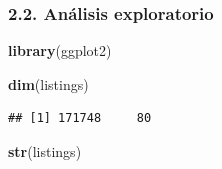 \documentclass[
]{article}
\newenvironment{Shaded}{\begin{snugshade}}{\end{snugshade}}
\newcommand{\FunctionTok}[1]{\textcolor[rgb]{0.13,0.29,0.53}{\textbf{#1}}}
\newcommand{\NormalTok}[1]{#1}
\begin{document}
\subsubsection{2.2. Análisis
exploratorio}\label{anuxe1lisis-exploratorio}

\begin{Shaded}
\begin{Highlighting}[]
\FunctionTok{library}\NormalTok{(ggplot2)}

\FunctionTok{dim}\NormalTok{(listings)}
\end{Highlighting}
\end{Shaded}

\begin{verbatim}
## [1] 171748     80
\end{verbatim}

\begin{Shaded}
\begin{Highlighting}[]
\FunctionTok{str}\NormalTok{(listings)}
\end{Highlighting}
\end{Shaded}
\end{document}
